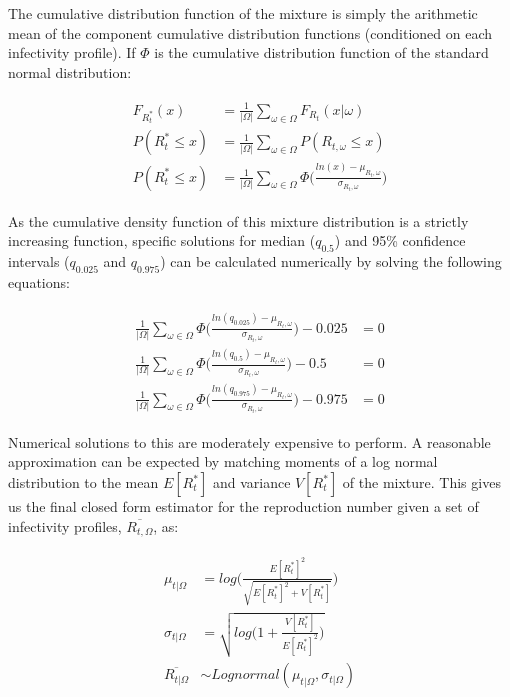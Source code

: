 \documentclass[10pt,letterpaper]{article}
\begin{document}
The cumulative distribution function of the mixture is simply the arithmetic mean of the component cumulative distribution functions (conditioned on each infectivity profile). If $\Phi$ is the cumulative distribution function of the standard normal distribution:

\begin{eqnarray}
\label{eq:final_3}
\begin{aligned}
F_{R_t^*}(x) &= \frac{1}{|\Omega|}\sum_{\omega \in \Omega}F_{R_t}(x|\omega) \\
P(R_t^* \le x) &= \frac{1}{|\Omega|}\sum_{\omega \in \Omega} P(R_{t,\omega} \le x) \\
P(R_t^* \le x) &= \frac{1}{|\Omega|}\sum_{\omega \in \Omega} \Phi\bigg(\frac{ln(x) - \mu_{R_t,\omega}}{\sigma_{R_t,\omega}}\bigg)
\end{aligned}
\end{eqnarray}

As the cumulative density function of this mixture distribution is a strictly increasing function, specific solutions for median ($q_{0.5}$) and 95\% confidence intervals ($q_{0.025}$ and $q_{0.975}$) can be calculated numerically by solving the following equations:

\begin{eqnarray}
\label{eq:final_4}
\begin{aligned}
\frac{1}{|\Omega|}\sum_{\omega \in \Omega} \Phi\bigg(\frac{ln(q_{0.025}) - \mu_{R_t,\omega}}{\sigma_{R_t,\omega}}\bigg) - 0.025 &= 0 \\
\frac{1}{|\Omega|}\sum_{\omega \in \Omega} \Phi\bigg(\frac{ln(q_{0.5}) - \mu_{R_t,\omega}}{\sigma_{R_t,\omega}}\bigg) - 0.5 &= 0 \\
\frac{1}{|\Omega|}\sum_{\omega \in \Omega} \Phi\bigg(\frac{ln(q_{0.975}) - \mu_{R_t,\omega}}{\sigma_{R_t,\omega}}\bigg) - 0.975 &= 0
\end{aligned}
\end{eqnarray}

Numerical solutions to this are moderately expensive to perform. A reasonable approximation can be expected by matching moments of a log normal distribution to the mean $E[R_t^*]$ and variance $V[R_t^*]$ of the mixture. This gives us the final closed form estimator for the reproduction number given a set of infectivity profiles, $\overline{R_{t,\Omega}}$, as:

\begin{eqnarray}
\begin{aligned}
\mu_{t|\Omega} &= log\bigg(\frac{E[R_t^*]^2}{\sqrt{E[R_t^*]^2 + V[R_t^*]}}\bigg) \\
\sigma_{t|\Omega} &= \sqrt{log\bigg(1 + \frac{V[R_t^*]}{E[R_t^*]^2}\bigg)}\\
\overline{R_{t|\Omega}} &\sim Lognormal(\mu_{t|\Omega},\sigma_{t|\Omega})
\end{aligned}
\end{eqnarray}
\end{document}
